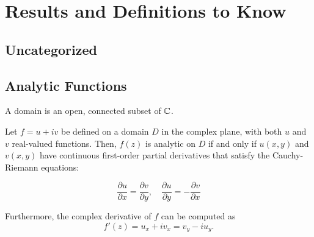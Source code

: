 \setchapterpreamble[u]{\margintoc}
\chapter{Results and Definitions to Know}

\section{Uncategorized}

\section{Analytic Functions}

\begin{definition}[Domain]
    A domain is an open, connected subset of $\mathbb{C}$.
\end{definition}

\begin{theorem}
    Let $f=u + iv$ be defined on a domain $D$ in the complex plane, with both $u$ and $v$ real-valued functions. Then, $f(z)$ is analytic on $D$ if and only if $u(x,y)$ and $v(x,y)$ have continuous first-order partial derivatives that satisfy the Cauchy-Riemann equations:

    \[\frac{\partial u}{\partial x} = \frac{\partial v}{\partial y}, \quad \frac{\partial u}{\partial y} = -\frac{\partial v}{\partial x}\]

    Furthermore, the complex derivative of $f$ can be computed as
    \[f'(z) = u_x + iv_x = v_y - iu_y.\]
\end{theorem}

\begin{theorem}
    
\end{theorem}